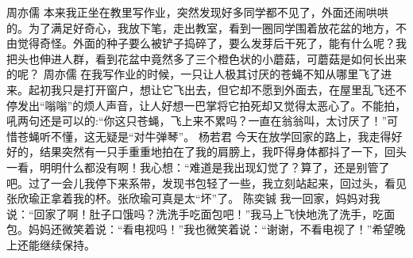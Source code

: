 {}\markdownRendererInterblockSeparator
{}周亦儒\markdownRendererInterblockSeparator
{}本来我正坐在教里写作业，突然发现好多同学都不见了，外面还闹哄哄的。为了满足好奇心，我放下笔，走出教室，看到一圈同学围着放花盆的地方，不由觉得奇怪。外面的种子要么被铲子捣碎了，要么发芽后干死了，能有什么呢？我把头也伸进人群，看到花盆中竟然多了三个橙色状的小蘑菇，可蘑菇是如何长出来的呢？ \markdownRendererInterblockSeparator
{}\markdownRendererInterblockSeparator
{}周亦儒\markdownRendererInterblockSeparator
{}在我写作业的时候，一只让人极其讨厌的苍蝇不知从哪里飞了进来。起初我只是打开窗户，想让它飞出去，但它却不愿到外面去，在屋里乱飞还不停发出“嗡嗡”的烦人声音，让人好想一巴掌将它拍死却又觉得太恶心了。不能拍，吼两句还是可以的:“你这只苍蝇，飞上来不累吗？一直在翁翁叫，太讨厌了！”可惜苍蝇听不懂，这无疑是“对牛弹琴”。\markdownRendererInterblockSeparator
{}\markdownRendererInterblockSeparator
{}杨若君\markdownRendererInterblockSeparator
{}今天在放学回家的路上，我走得好好的，结果突然有一只手重重地拍在了我的肩膀上，我吓得身体都抖了一下，回头一看，明明什么都没有啊！我心想：“难道是我出现幻觉了？算了，还是别管了吧。过了一会儿我停下来系带，发现书包轻了一些，我立刻站起来，回过头，看见张欣瑜正拿着我的杯。张欣瑜可真是太“坏”了。\markdownRendererInterblockSeparator
{}\markdownRendererInterblockSeparator
{}陈奕铖\markdownRendererInterblockSeparator
{}我一回家，妈妈对我说：“回家了啊！肚子口饿吗？洗洗手吃面包吧！”我马上飞快地洗了洗手，吃面包。妈妈还微笑着说：“看电视吗！”我也微笑着说：“谢谢，不看电视了！”希望晚上还能继续保持。\markdownRendererDocumentEnd
